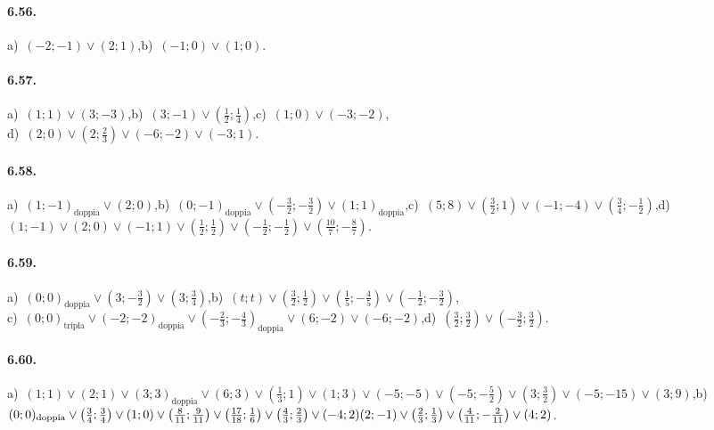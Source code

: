\paragraph{6.56.} a)~$(-2;-1)\vee(2;1)$,\quad b)~$(-1;0)\vee(1;0)$.

\paragraph{6.57.} a)~$(1;1)\vee(3;-3)$,\quad b)~$(3;-1)\vee\left(\frac 1 2;\frac 1 4\right)$,\quad c)~$(1;0)\vee(-3;-2)$,\protect\\
\quad d)~$(2;0)\vee\left(2;\frac 2 3\right)\vee(-6;-2)\vee(-3;1)$.

\paragraph{6.58.} a)~$(1;-1)_\text{doppia} \vee(2;0)$,\quad b)~$(0;-1)_\text{doppia}\vee\left(-\frac 3 2;-\frac 3 2\right)\vee(1;1)_\text{doppia}$,\quad c)~$(5;8)\vee\left(\frac 3 2;1\right)\vee(-1;-4)\vee\left(\frac 3 4;-\frac 1 2\right)$,\quad d)~$(1;-1)\vee(2;0)\vee(-1;1)\vee\left(\frac 1 2;\frac 1 2\right)\vee\left(-\frac 1 2;-\frac 1 2\right)\vee\left(\frac{10} 7;-\frac 8 7\right)$.

\paragraph{6.59.}a)~$(0;0)_\text{doppia}\vee\left(3;-\frac 3 2\right)\vee(3;\frac 3 4)$,\quad b)~$(t;t)\vee\left(\frac 3 2;\frac 1 2\right)\vee\left(\frac 1 5;-\frac 4 5\right)\vee\left(-\frac 1 2;-\frac 3 2\right)$,\protect\\
\quad c)~$(0;0)_\text{tripla}\vee(-2;-2)_\text{doppia}\vee\left(-\frac 2 3;-\frac 4 3\right)_\text{doppia}\vee(6;-2)\vee(-6;-2)$,\quad d)~$\left(\frac 3 2;\frac 3 2\right)\vee\left(-\frac 3 2;\frac 3 2\right)$.

\paragraph{6.60.} a)~$(1;1)\vee(2;1)\vee(3;3)_\text{doppia}\vee(6;3)\vee\left(\frac 1 3;1\right)\vee(1;3)\vee(-5;-5)\vee\left(-5;-\frac 5 2\right)\vee\left(3;\frac 3 2\right)\vee(-5;-15)\vee(3;9)$,\quad b)~$(0;0)_\text{doppia}\vee\left(\frac 3 4;\frac 3 4\right)\vee(1;0)\vee\left(\frac 8{11};\frac 9{11}\right)\vee\left(\frac{17}{18};\frac 1 6\right)\vee\left(\frac 4 3;\frac 2 3\right)\vee\protect\\
(-4;2)(2;-1)\vee\left(\frac 2 3;\frac 1 3\right)\vee\left(\frac 4{11};-\frac 2{11}\right)\vee(4;2)$.

